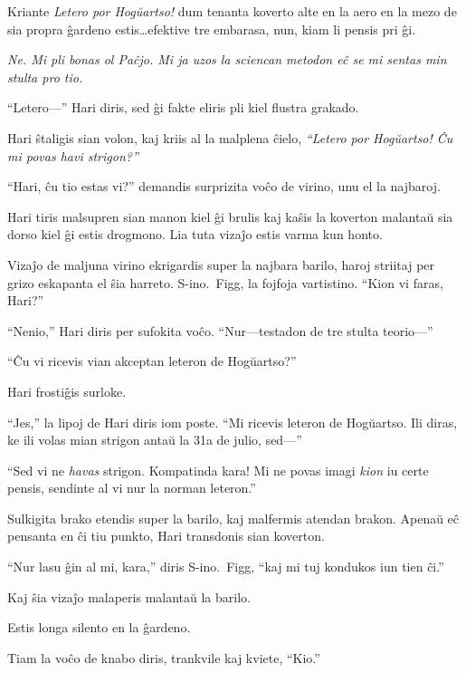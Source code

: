 Kriante \emph{Letero por Hogŭartso!} dum tenanta koverto alte en la aero en la mezo de sia propra ĝardeno estis…efektive tre embarasa, nun, kiam li pensis pri ĝi.

\emph{Ne.
Mi pli bonas ol Paĉjo.
Mi ja uzos la sciencan metodon eĉ se mi sentas min stulta pro tio.}

“Letero—” Hari diris, sed ĝi fakte eliris pli kiel flustra grakado.

Hari ŝtaligis sian volon, kaj kriis al la malplena ĉielo, \emph{“Letero por Hogŭartso!
Ĉu mi povas havi strigon?”}

“Hari, ĉu tio estas vi?” demandis surprizita voĉo de virino, unu el la najbaroj.

Hari tiris malsupren sian manon kiel ĝi brulis kaj kaŝis la koverton malantaŭ sia dorso kiel ĝi estis drogmono.
Lia tuta vizaĵo estis varma kun honto.

Vizaĵo de maljuna virino ekrigardis super la najbara barilo, haroj striitaj per grizo eskapanta el ŝia harreto.
S\nobreakdash-ino.~Figg, la fojfoja vartistino.
“Kion vi faras, Hari?”

“Nenio,” Hari diris per sufokita voĉo.
“Nur—testadon de tre stulta teorio—”

“Ĉu vi ricevis vian akceptan leteron de Hogŭartso?”

Hari frostiĝis surloke.

“Jes,” la lipoj de Hari diris iom poste.
“Mi ricevis leteron de Hogŭartso.
Ili diras, ke ili volas mian strigon antaŭ la 31a de julio, sed—”

“Sed vi ne \emph{havas} strigon.
Kompatinda kara!
Mi ne povas imagi \emph{kion} iu certe pensis, sendinte al vi nur la norman leteron.”

Sulkigita brako etendis super la barilo, kaj malfermis atendan brakon.
Apenaŭ eĉ pensanta en ĉi tiu punkto, Hari transdonis sian koverton.

“Nur lasu ĝin al mi, kara,” diris S\nobreakdash-ino.~Figg, “kaj mi tuj kondukos iun tien ĉi.”

Kaj ŝia vizaĵo malaperis malantaŭ la barilo.

Estis longa silento en la ĝardeno.

Tiam la voĉo de knabo diris, trankvile kaj kviete, “Kio.”
